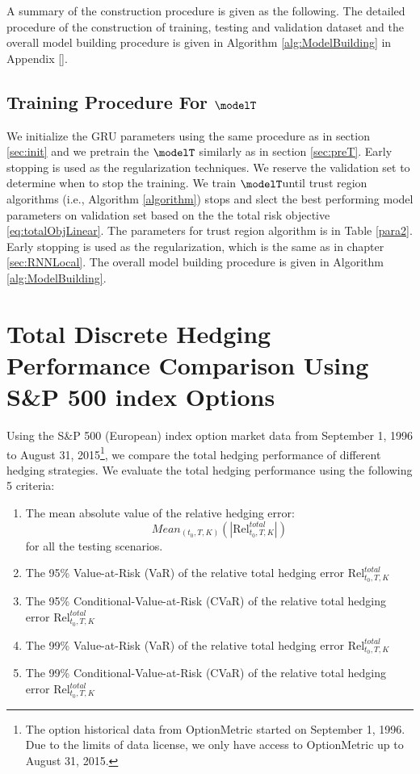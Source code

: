 A summary of the construction procedure is given as the following. The detailed procedure of the construction of  training, testing and validation dataset and the overall model building procedure is given in Algorithm \ref{alg:ModelBuilding} in Appendix \ref{}.



\subsection{Training Procedure For $\modelT$}
\label{sec:TotalModelProcedure}
We  initialize the  GRU parameters using the same procedure as in section \ref{sec:init} and we pretrain the $\modelT$ similarly as in section \ref{sec:preT}. Early stopping is used as the regularization techniques. We reserve the validation set to determine when to stop the training. 
We train $\modelT$until trust region algorithms (i.e., Algorithm \ref{algorithm}) stops and slect the best performing model parameters on validation set based on  the the total risk objective \eqref{eq:totalObjLinear}. The  parameters for trust region algorithm is in Table \ref{para2}. Early stopping is used as the regularization, which is the same as in chapter \ref{sec:RNNLocal}. The overall model building procedure is given in Algorithm \ref{alg:ModelBuilding}.
\section{Total Discrete Hedging Performance Comparison Using  S\&P 500 index Options} \label{sec:totalcriteria}
Using the S\&P 500  ({European})  index option market data from September 1, 1996 to August 31, 2015\footnote{The option historical data from OptionMetric \cite{optionmetrics2008ivy} started on September 1, 1996. Due to the limits of data license, we only have access to OptionMetric up to  August 31, 2015.},
we  compare the total hedging performance of different hedging strategies.
We evaluate the total hedging performance using the following 5 criteria:
\begin{enumerate}
	\item The mean absolute value of the relative hedging error:
	\[
	Mean_{(t_0,T,K)}\left(\left|\text{Rel}^{total}_{t_0,T,K}\right|\right)
	\] for all the testing scenarios.
	\item The 95\% Value-at-Risk (VaR) of the relative total hedging error $\text{Rel}^{total}_{t_0,T,K}$
	\item The 95\% Conditional-Value-at-Risk (CVaR) of the relative total hedging error $\text{Rel}^{total}_{t_0,T,K}$
	\item The 99\% Value-at-Risk (VaR) of the relative total hedging error $\text{Rel}^{total}_{t_0,T,K}$
	\item The 99\% Conditional-Value-at-Risk (CVaR) of the relative total hedging error $\text{Rel}^{total}_{t_0,T,K}$
\end{enumerate}


